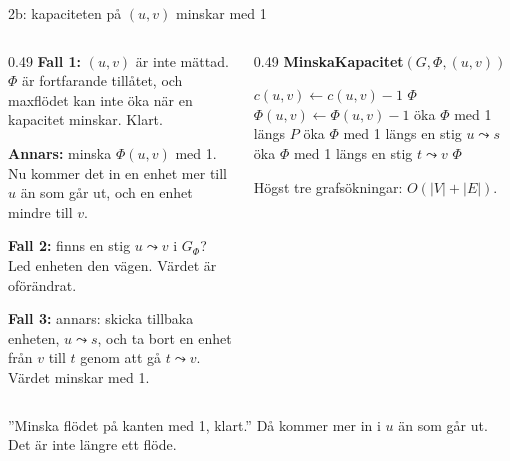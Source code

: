 \begin{frame}{2b: kapaciteten på $(u,v)$ minskar med 1}
\begin{columns}[T]
\begin{column}{0.49\textwidth}
\small
\textbf{Fall 1:} $(u,v)$ är inte mättad. $\Phi$ är fortfarande tillåtet, och maxflödet kan inte
öka när en kapacitet minskar. Klart.\par\smallskip
\textbf{Annars:} minska $\Phi(u,v)$ med 1. Nu kommer det in en enhet mer till $u$ än som går ut,
och en enhet mindre till $v$.\par\smallskip
\textbf{Fall 2:} finns en stig $u\leadsto v$ i $G_\Phi$? Led enheten den vägen. Värdet är
oförändrat.\par\smallskip
\textbf{Fall 3:} annars: skicka tillbaka enheten, $u\leadsto s$, och ta bort en enhet från $v$
till $t$ genom att gå $t\leadsto v$. Värdet minskar med 1.
\end{column}
\begin{column}{0.49\textwidth}
{\small\bfseries\color{kthnavy}MinskaKapacitet$(G,\Phi,(u,v))$}
\footnotesize
\begin{algorithmic}[1]
\State $c(u,v)\gets c(u,v)-1$
 \State \Return $\Phi$ 
\EndIf
\State $\Phi(u,v)\gets\Phi(u,v)-1$ 
  \State öka $\Phi$ med 1 längs $P$ 
\Else
  \State öka $\Phi$ med 1 längs en stig $u\leadsto s$ 
  \State öka $\Phi$ med 1 längs en stig $t\leadsto v$
\EndIf
\State \Return $\Phi$
\end{algorithmic}
\smallskip
{\footnotesize Högst tre grafsökningar: $O(|V|+|E|)$.}
\end{column}
\end{columns}
\vfill
\begin{missbox}
”Minska flödet på kanten med 1, klart.” Då kommer mer in i $u$ än som går ut. Det är inte längre
ett flöde.
\end{missbox}
\end{frame}

